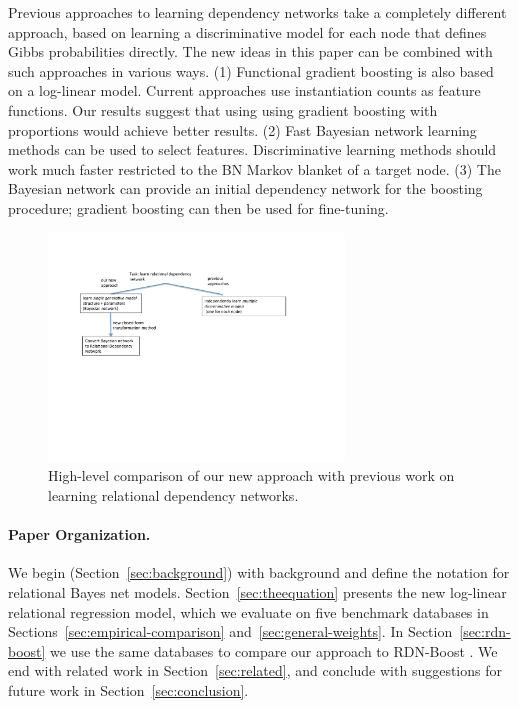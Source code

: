 \documentclass[twoside,11pt]{article}
\newcommand{\strongpoint}[1]{\paragraph{#1.}}
\begin{document}
Previous approaches to learning dependency networks take a completely different approach, based on learning a discriminative model for each node that defines Gibbs probabilities directly. The new ideas in this paper can be combined with such approaches in various ways. (1) Functional gradient boosting is also based on a log-linear model. Current approaches use instantiation counts as feature functions. Our results suggest that using using gradient boosting with proportions would achieve better results. (2) Fast Bayesian network learning methods can be used to select features. Discriminative learning methods should work much faster restricted to the BN Markov blanket of a target node. (3) The Bayesian network can provide an initial dependency network for the boosting procedure; gradient boosting can then be used for fine-tuning.

\begin{figure}[htbp]
\begin{center}
\includegraphics[width=0.7\textwidth]{novelty}
\caption{High-level comparison of our new approach with previous work on learning relational dependency networks.}
\label{fig:novelty}
\end{center}
\end{figure}


\strongpoint{Paper Organization}
We begin (Section~\ref{sec:background}) with background and define the notation for relational Bayes net models.
Section~\ref{sec:theequation} presents the new log-linear relational regression model, which we evaluate
on five benchmark databases in Sections~\ref{sec:empirical-comparison} and~\ref{sec:general-weights}.
In Section~\ref{sec:rdn-boost} we use the same databases to compare our approach to RDN-Boost \cite{Khot2011}.
We end with related work in Section~\ref{sec:related}, and conclude with suggestions for future work in Section~\ref{sec:conclusion}.
\end{document}

